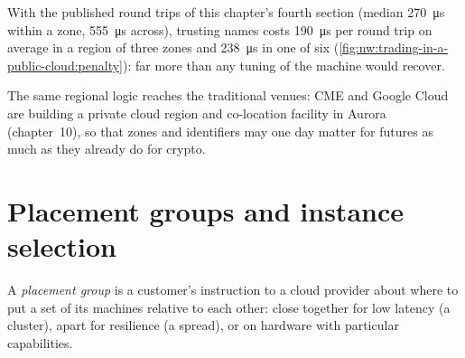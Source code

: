 \label{lst:nw:trading-in-a-public-cloud:zones}

With the published round trips of this chapter's fourth section (median \qty{270}{\micro\second} within a zone, \qty{555}{\micro\second} across),
trusting names costs \qty{190}{\micro\second} per round trip on average in a region of three zones and \qty{238}{\micro\second} in one of six
(\cref{fig:nw:trading-in-a-public-cloud:penalty}): far more than any tuning of the machine would recover.

\begin{omfigure}

\label{fig:nw:trading-in-a-public-cloud:penalty}
\end{omfigure}

The same regional logic reaches the traditional venues: CME and Google Cloud are building a private cloud region and co-location facility in
Aurora (chapter~10), so that zones and identifiers may one day matter for futures as much as they already do for crypto.

\section{Placement groups and instance selection}

\begin{definition}\label{def:nw:trading-in-a-public-cloud:pg}
A \emph{placement group} is a customer's instruction to a cloud provider about where to put a set of its machines relative
to each other: close together for low latency (a cluster), apart for resilience (a spread), or on hardware with particular capabilities.
\end{definition}

